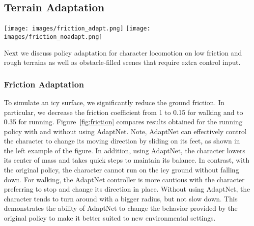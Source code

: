 \subsection{Terrain Adaptation}
\label{sec:domainadapt}
\begin{figure*}[t]
    \centering
    \texttt{[image: images/friction\_adapt.png]}\hfill
    \texttt{[image: images/friction\_noadapt.png]}
    \caption{Comparison of characters controlled with and without AdaptNet running on an ice floor with very low friction. Left: character controlled with AdaptNet slides and skids on the ice ground while running. Right: character without AdaptNet slips down. 
    }
    \label{fig:friction}
\end{figure*}

Next we discuss policy adaptation for character locomotion on low friction and rough terrains as well as obstacle-filled scenes that require extra control input.    



\subsubsection{Friction Adaptation}
To simulate an icy surface,
we significantly reduce the ground friction.
In particular, we decrease the friction coefficient  
from 1 to 0.15 for walking and to 0.35 for running. 
Figure~\ref{fig:friction} compares results obtained for the running policy with and without using AdaptNet. 
Note, AdaptNet can effectively control the character to change its moving direction by sliding on its feet, 
as shown in the left example of the figure. 
In addition, using AdaptNet, 
the character lowers its center of mass and takes quick steps to maintain its balance. 
In contrast, 
with the original %
policy, the character cannot run on the icy ground without falling down. 
For walking, the AdaptNet controller is more cautious with the character preferring to stop and change its direction in place. 
Without using AdaptNet, the character tends to turn around with a bigger radius, but not slow down. 
This demonstrates the ability of AdaptNet to change the behavior provided by the original policy to make it better suited to new environmental settings. 




